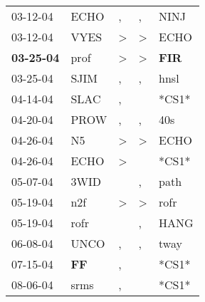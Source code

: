 \begin{supertabular}{p{0.07\textwidth}p{0.06\textwidth}p{0.02\textwidth}p{0.02\textwidth}p{0.06\textwidth}}
          03-12-04\textsuperscript{} &           ECHO\textsuperscript{} &                , &                , &           NINJ\textsuperscript{} \\
          03-12-04\textsuperscript{} &           VYES\textsuperscript{} &     \textgreater &     \textgreater &           ECHO\textsuperscript{} \\
 \textbf{03-25-04\textsuperscript{}} &           prof\textsuperscript{} &     \textgreater &     \textgreater &   \textbf{FIR\textsuperscript{}} \\
          03-25-04\textsuperscript{} &           SJIM\textsuperscript{} &                , &                , &           hnsl\textsuperscript{} \\
          04-14-04\textsuperscript{} &           SLAC\textsuperscript{} &                , &                  &                            *CS1* \\
          04-20-04\textsuperscript{} &           PROW\textsuperscript{} &                , &                , &            40s\textsuperscript{} \\
          04-26-04\textsuperscript{} &             N5\textsuperscript{} &     \textgreater &     \textgreater &           ECHO\textsuperscript{} \\
          04-26-04\textsuperscript{} &           ECHO\textsuperscript{} &     \textgreater &                  &                            *CS1* \\
          05-07-04\textsuperscript{} &           3WID\textsuperscript{} &                  &                , &           path\textsuperscript{} \\
          05-19-04\textsuperscript{} &            n2f\textsuperscript{} &     \textgreater &     \textgreater &           rofr\textsuperscript{} \\
          05-19-04\textsuperscript{} &           rofr\textsuperscript{} &                  &                , &           HANG\textsuperscript{} \\
          06-08-04\textsuperscript{} &           UNCO\textsuperscript{} &                , &                , &           tway\textsuperscript{} \\
          07-15-04\textsuperscript{} &    \textbf{FF\textsuperscript{}} &                , &                  &                            *CS1* \\
          08-06-04\textsuperscript{} &           srms\textsuperscript{} &                , &                  &                            *CS1* \\

\end{supertabular}
